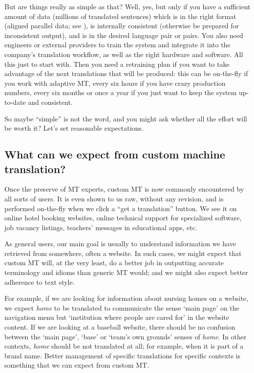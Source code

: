\documentclass[output=paper]{langscibook}
\begin{document}
But are things really as simple as that? Well, yes, but only if you have a sufficient amount of data (millions of translated sentences) which is in the right format (aligned parallel data; see ), is internally consistent (otherwise be prepared for inconsistent output), and is in the desired language pair or pairs. You also need engineers or external providers to train the system and integrate it into the company's translation workflow, as well as the right hardware and software. All this just to start with. Then you need a retraining plan if you want to take advantage of the next translations that will be produced: this can be on-the-fly if you work with adaptive MT, every six hours if you have crazy production numbers, every six months or once a year if you just want to keep the system up-to-date and consistent.  

So maybe “simple” is not the word,  and you might ask whether all the effort will be worth it? Let’s set reasonable expectations.

\subsection{What can we expect from custom machine translation?}

Once the preserve of MT experts, custom MT is now commonly encountered by all sorts of users. It is even shown to us raw, without any revision, and is performed on-the-fly when we click a “get a translation” button. We see it on online hotel booking websites, online technical support for specialized software, job vacancy listings, teachers’ messages in educational apps, etc. 

As general users, our main goal is usually to understand information we have retrieved from somewhere, often a website. In such cases, we might expect that custom MT will, at the very least, do a better job in outputting accurate terminology and idioms than generic MT would; and we might also expect better adherence to text style. 

For example, if we are looking for information about nursing homes on a website, we expect \textit{home} to be translated to communicate the sense `main page' on the navigation menu but `institution where people are cared for' in the website content. If we are looking at a baseball website, there should be no confusion between the `main page', `base' or `team's own grounds' senses of \textit{home}. In other contexts, \textit{home} should be not translated at all; for example, when it is part of a brand name. Better management of specific translations for specific contexts is something that we can expect from custom MT. 
\end{document}
